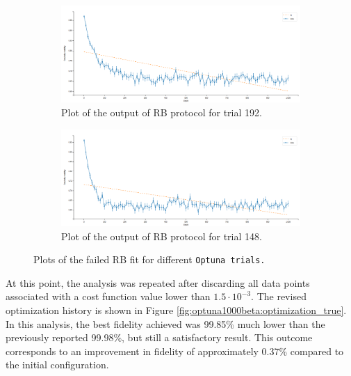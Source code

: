 \begin{figure}[h!]
    \begin{subfigure}[t]{0.45\textwidth}
        \includegraphics[width=\textwidth]{figures/png/RB_optimization/Optuna/1000beta/failed3.png}
        \caption{Plot of the output of RB protocol for trial 192.}
        \label{fig:optuna1000beta:failed3}
    \end{subfigure}
    \hfill
    \begin{subfigure}[t]{0.45\textwidth}
        \includegraphics[width=\textwidth]{figures/png/RB_optimization/Optuna/1000beta/failed4.png}
        \caption{Plot of the output of RB protocol for trial 148.}
        \label{fig:optuna1000beta:failed4}
    \end{subfigure}

    \caption{Plots of the failed RB fit for different \tt{Optuna} trials.}
    \label{fig:RBfailed}
\end{figure}

At this point, the analysis was repeated after discarding all data points associated with a cost function value lower than $1.5 \cdot 10^{-3}$. 
The revised optimization history is shown in Figure \ref{fig:optuna1000beta:optimization_true}. 
In this analysis, the best fidelity achieved was 99.85\% much lower than the previously reported 99.98\%, but still a satisfactory result. 
This outcome corresponds to an improvement in fidelity of approximately 0.37\% compared to the initial configuration.

